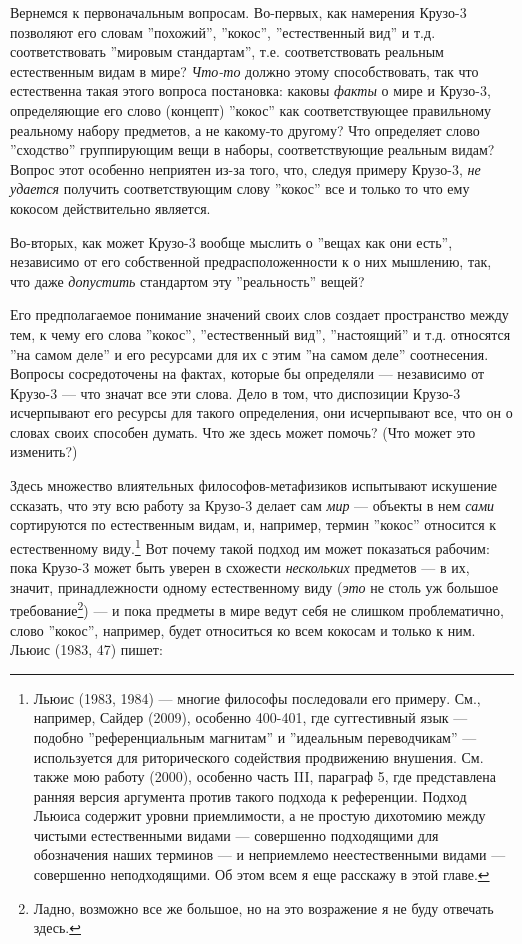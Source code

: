 \documentclass[11pt]{book}
\begin{document}
Вернемся к первоначальным вопросам. Во-первых, как намерения Крузо-3 позволяют его словам ''похожий'', ''кокос'', ''естественный вид'' и т.д. соответствовать ''мировым стандартам'', т.е. соответствовать реальным естественным видам в мире? \textit{Что-то} должно этому способствовать, так что естественна такая этого вопроса постановка: каковы \textit{факты} о мире и Крузо-3, определяющие его слово (концепт) ''кокос'' как соответствующее правильному реальному набору предметов, а не какому-то другому? Что определяет слово ''сходство'' группирующим вещи в наборы, соответствующие реальным видам? Вопрос этот особенно неприятен из-за того, что, следуя примеру Крузо-3, \textit{не удается} получить соответствующим слову ''кокос'' все и только то что ему кокосом действительно является.

Во-вторых, как может Крузо-3 вообще мыслить о ''вещах как они есть'', независимо от его собственной предрасположенности к о них мышлению, так, что даже \textit{допустить} стандартом эту ''реальность'' вещей?

Его предполагаемое понимание значений своих слов создает пространство между тем, к чему его слова ''кокос'', ''естественный вид'', ''настоящий'' и т.д. относятся ''на самом деле'' и его ресурсами для их с этим ''на самом деле'' соотнесения. Вопросы сосредоточены на фактах, которые бы определяли --- независимо от Крузо-3 --- что значат все эти слова. Дело в том, что диспозиции Крузо-3 исчерпывают его ресурсы для такого определения, они исчерпывают все, что он о словах своих способен думать. Что же здесь может помочь? (Что может это изменить?)

Здесь множество влиятельных философов-метафизиков испытывают искушение ссказать, что эту всю работу за Крузо-3 делает сам \textit{мир} --- объекты в нем \textit{сами} сортируются по естественным видам, и, например, термин ''кокос'' относится к естественному виду.\footnote{Льюис (1983, 1984) --- многие философы последовали его примеру. См., например, Сайдер (2009), особенно 400-401, где суггестивный язык --- подобно ''референциальным магнитам'' и ''идеальным переводчикам'' --- используется для риторического содействия продвижению внушения. См. также мою работу (2000), особенно часть III, параграф 5, где представлена ранняя версия аргумента против такого подхода к референции. Подход Льюиса содержит уровни приемлимости, а не простую дихотомию между чистыми естественными видами --- совершенно подходящими для обозначения наших терминов --- и неприемлемо неестественными видами --- совершенно неподходящими. Об этом всем я еще расскажу в этой главе.} Вот почему такой подход им может показаться рабочим: пока Крузо-3 может быть уверен в схожести \textit{нескольких} предметов --- в их, значит, принадлежности одному естественному виду (\textit{это} не столь уж большое требование\footnote{Ладно, возможно все же большое, но на это возражение я не буду отвечать здесь.}) --- и пока предметы в мире ведут себя не слишком проблематично, слово ''кокос'', например, будет относиться ко всем кокосам и только к ним. Льюис (1983, 47) пишет:
\end{document}
